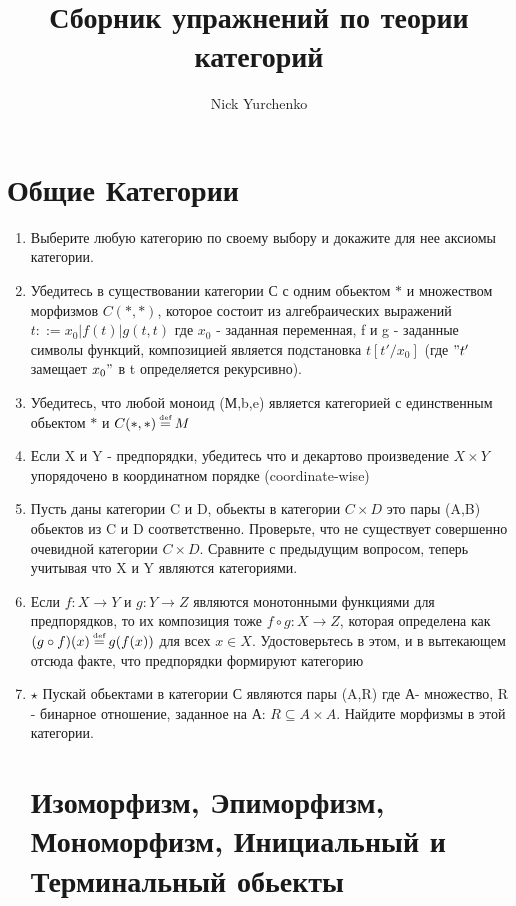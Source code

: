 \documentclass[12pt,a4paper]{article}
\author{Nick Yurchenko}
\title{Сборник упражнений по теории категорий}
\newcommand\defeq{\mathrel{\stackrel{\makebox[0pt]{\mbox{\normalfont\tiny def}}}{=}}}
\begin{document}
\maketitle
\vspace{5cm}
\section{Общие Категории}
\begin{enumerate}
\item Выберите любую категорию по своему выбору и докажите для нее аксиомы категории.

\item Убедитесь в существовании категории $С$ с одним обьектом $\ast$ и множеством морфизмов $C(\ast , \ast)$, которое состоит из алгебраических выражений $t::=x_0|f(t)|g(t,t)$ где $x_0$  - заданная переменная, f и g - заданные символы функций, композицией является подстановка $t[t'/x_0]$ (где $"t'$ замещает $x_0"$ в t определяется рекурсивно).

\item Убедитесь, что любой моноид (М,b,e) является категорией с единственным обьектом $\ast$ и $C(\ast , \ast) \defeq M$

\item Если X и Y - предпорядки, убедитесь что и декартово произведение $X \times Y$ упорядочено в координатном порядке (coordinate-wise)

\item Пусть даны категории C и D, обьекты в категории $C \times D$ это пары (A,B) обьектов из C и D соответственно. Проверьте, что не существует совершенно очевидной категории $C \times D$. Сравните с предыдущим вопросом, теперь учитывая что X и Y являются категориями.

\item Если $f : X \rightarrow Y$ и $g : Y \rightarrow Z$ являются монотонными функциями для предпорядков, то их композиция тоже $f \circ g : X \rightarrow Z$, которая определена как $(g \circ f)(x) \defeq g(f(x))$ для всех $x \in  X$. Удостоверьтесь в этом, и в вытекающем отсюда факте, что предпорядки формируют категорию

\item $\star$ Пускай обьектами в категории С являются пары (A,R) где А- множество, R - бинарное отношение, заданное на А: $R \subseteq A \times A$. Найдите морфизмы в этой категории.

\section{Изоморфизм, Эпиморфизм, Мономорфизм, Инициальный и Терминальный обьекты}


\end{enumerate}
\end{document}

